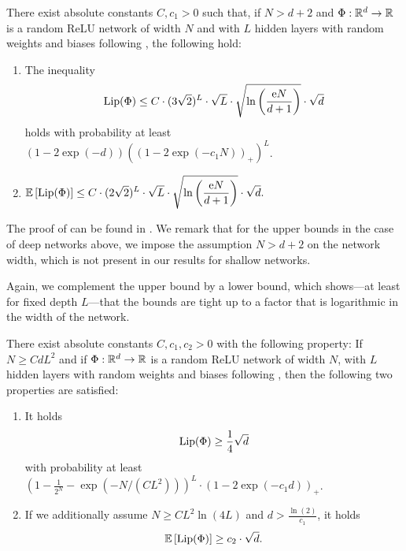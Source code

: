 \begin{theorem}\label{thm:main_2}
  There exist absolute constants $C, c_1 > 0$ such that, if $N > d + 2$ and $\Phi: \mathbb{R}^d \to \mathbb{R}$
  is a random ReLU network of width $N$ and with $L$ hidden layers with random weights
  and biases following , the following hold:
  \begin{enumerate}
  \item The inequality
        \begin{align*}
          \operatorname{Lip}(\Phi)
          \leq C \cdot (3\sqrt{2})^{L}
                 \cdot \sqrt{L}
                 \cdot \sqrt{\ln \left(\frac{\mathrm{e} N}{d+1}\right)}
                 \cdot \sqrt{d} 
        \end{align*}
        holds with probability at least $(1-2\exp(- d))\left((1-2\exp(-c_1N))_+\right)^L$.
        \vspace*{0.1cm}
  
  \item \(
          \displaystyle
          \mathbb{E} \left[\operatorname{Lip}(\Phi) \right]
          \leq C \cdot (2 \sqrt{2})^{L}
                 \cdot \sqrt{L}
                 \cdot \sqrt{\ln \left(\frac{\mathrm{e} N}{d+1}\right)}
                 \cdot \sqrt{d}.
        \)
  \end{enumerate}
\end{theorem}

The proof of  can be found in .
We remark that for the upper bounds in the case of deep networks above,
we impose the assumption $N > d+2$ on the network width, which is not present
in our results for shallow networks.

Again, we complement the upper bound by a lower bound,
which shows---at least for fixed depth $L$---that the bounds are tight up to
a factor that is logarithmic in the width of the network.

\begin{theorem}\label{thm:main_3}
  There exist absolute constants $C, c_1,c_2 > 0$ with the following property: 
  If $N \geq CdL^2$ and if $\Phi:\mathbb{R}^d \to \mathbb{R}$ is a random ReLU network of width $N$, with $L$ hidden layers 
  with random weights and biases following , 
  then the following two properties are satisfied:
\begin{enumerate}
\item It holds
\begin{equation*}
\operatorname{Lip}(\Phi) \geq \frac{1}{4} \sqrt{d}
\end{equation*}
with probability at least $\left(1 - \frac{1}{2^N}-\exp(-N/(CL^2))\right)^L \cdot (1- 2 \exp (-c_1 d ))_+$. 
\item If we additionally assume $N \geq CL^2 \ln(4L)$ and $d> \frac{\ln(2)}{c_1}$, it holds \begin{equation*}
\mathbb{E} \left[\operatorname{Lip}(\Phi)\right] \geq c_2 \cdot \sqrt{d}.
\end{equation*}
\end{enumerate}
\end{theorem}

